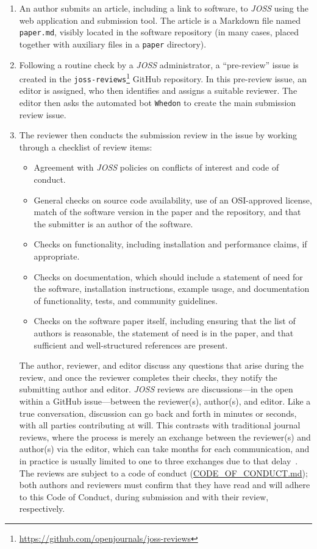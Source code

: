 \documentclass{article}
\newcommand\joss{\textit{JOSS}}
\begin{document}
\begin{enumerate}
\item An author submits an article, including a link to software, to \joss{} using the web application and submission tool.
The article is a Markdown file named \texttt{paper.md}, visibly located in the software repository (in many cases, placed together with auxiliary files in a \texttt{paper} directory).

\item Following a routine check by a \joss{} administrator, a ``pre-review'' issue is created in the \texttt{joss-reviews}\footnote{\url{https://github.com/openjournals/joss-reviews}} GitHub repository. In this pre-review issue, an editor is assigned, who then identifies and assigns a suitable reviewer. The editor then asks the automated bot \texttt{Whedon} to create the main submission review issue.

\item The reviewer then conducts the submission review in the issue by working through a checklist of review items:

\begin{itemize}
\item Agreement with \joss{} policies on conflicts of interest and code of conduct.
\item General checks on source code availability, use of an OSI-approved license, match of the software version in the paper and the repository, and that the submitter is an author of the software.
\item Checks on functionality, including installation and performance claims, if appropriate.
\item Checks on documentation, which should include a statement of need for the software, installation instructions, example usage, and documentation of functionality, tests, and community guidelines.
\item Checks on the software paper itself, including ensuring that the list of authors is reasonable, the statement of need is in the paper, and that sufficient and well-structured references are present.
\end{itemize}

The author, reviewer, and editor discuss any questions that arise during the review, and once the reviewer completes their checks, they notify the submitting author and editor. 
\joss{} reviews are discussions---in the open within a GitHub issue---between the reviewer(s), author(s), and editor. 
Like a true conversation, discussion can go back and forth in minutes or seconds, with all parties contributing at will. This contrasts with traditional journal reviews, where the process is merely an exchange between the reviewer(s) and author(s) via the editor, which can take months for each communication, and in practice is usually limited to one to three exchanges due to that delay~\cite{tennant-peerreview}.
The reviews are subject to a code of conduct (\href{https://github.com/openjournals/joss/blob/master/CODE_OF_CONDUCT.md}{CODE\_OF\_CONDUCT.md}); both authors and reviewers must confirm that they have read and will adhere to this Code of Conduct, during submission and with their review, respectively.


\end{enumerate}
\end{document}
